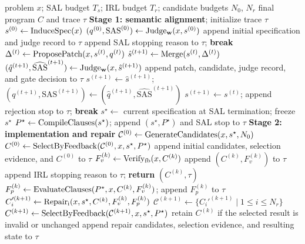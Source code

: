 \begin{algorithm}[t]
\caption{Semantic-contract-based dual-loop generation}
\label{alg:dual_loop}
\begin{algorithmic}[1]
\REQUIRE problem $x$; SAL budget $T_s$; IRL budget $T_r$; candidate budgets $N_0$, $N_r$
\ENSURE final program $C$ and trace $\tau$
\STATE \textbf{Stage 1: semantic alignment}; initialize trace $\tau$
\STATE $s^{(0)}\gets\mathrm{InduceSpec}(x)$
\STATE $(q^{(0)},\mathrm{SAS}^{(0)})\gets\mathrm{Judge_{\mathbf w}}(x,s^{(0)})$
\STATE append initial specification and judge record to $\tau$
    \STATE append SAL stopping reason to $\tau$; \textbf{break}
  \ENDIF
  \STATE $\Delta^{(t)}\gets\mathrm{ProposePatch}(x,s^{(t)},q^{(t)})$
  \STATE $\hat{s}^{(t+1)}\gets\mathrm{Merge}(s^{(t)},\Delta^{(t)})$
  \STATE $(\hat q^{(t+1)},\widehat{\mathrm{SAS}}^{(t+1)})\gets\mathrm{Judge_{\mathbf w}}(x,\hat{s}^{(t+1)})$
  \STATE append patch, candidate, judge record, and gate decision to $\tau$
    \STATE $s^{(t+1)}\gets\hat{s}^{(t+1)}$; $(q^{(t+1)},\mathrm{SAS}^{(t+1)})\gets(\hat q^{(t+1)},\widehat{\mathrm{SAS}}^{(t+1)})$
  \ELSE
    \STATE $s^{(t+1)}\gets s^{(t)}$; append rejection stop to $\tau$; \textbf{break}
  \ENDIF
\ENDFOR
\STATE $s^\star\gets$ current specification at SAL termination; freeze $s^\star$
\STATE $P^\star\gets\mathrm{CompileClauses}(s^\star)$; append $(s^\star,P^\star)$ and SAL stop to $\tau$
\STATE \textbf{Stage 2: implementation and repair}
\STATE $\mathcal C^{(0)}\gets\mathrm{GenerateCandidates}(x,s^\star,N_0)$
\STATE $C^{(0)}\gets\mathrm{SelectByFeedback}(\mathcal C^{(0)},x,s^\star,P^\star)$
\STATE append initial candidates, selection evidence, and $C^{(0)}$ to $\tau$
  \STATE $F_v^{(k)}\gets\mathrm{Verify_{fb}}(x,C^{(k)})$
  \STATE append $(C^{(k)},F_v^{(k)})$ to $\tau$
    \STATE append IRL stopping reason to $\tau$; \textbf{return} $(C^{(k)},\tau)$
  \ENDIF
  \STATE $F_p^{(k)}\gets\mathrm{EvaluateClauses}(P^\star,x,C^{(k)},F_v^{(k)})$; append $F_p^{(k)}$ to $\tau$
    \STATE $C_i'^{(k+1)}\gets\mathrm{Repair_i}(x,s^\star,C^{(k)},F_v^{(k)},F_p^{(k)})$
  \ENDFOR
  \STATE $\mathcal C^{(k+1)}\gets\{C_i'^{(k+1)}\mid 1\leq i\leq N_r\}$
  \STATE $C^{(k+1)}\gets\mathrm{SelectByFeedback}(\mathcal C^{(k+1)},x,s^\star,P^\star)$
  \STATE retain $C^{(k)}$ if the selected result is invalid or unchanged
  \STATE append repair candidates, selection evidence, and resulting state to $\tau$
\ENDFOR
\end{algorithmic}
\end{algorithm}

